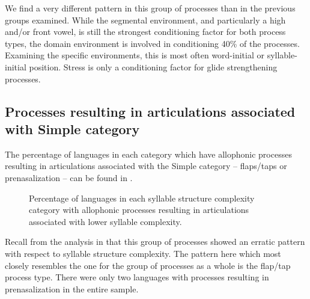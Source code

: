   We find a very different pattern in this group of processes than in the previous groups examined. While the segmental environment, and particularly a high and/or front vowel, is still the strongest conditioning factor for both process types, the domain environment is involved in conditioning 40\% of the processes. Examining the specific environments, this is most often word-initial or syllable-initial position. Stress is only a conditioning factor for glide strengthening processes.

\subsection{Processes resulting in articulations associated with Simple category}\label{sec:7.3.5}

  The percentage of languages in each category which have allophonic processes resulting in articulations associated with the Simple category -- flaps/taps or prenasalization -- can be found in .

\begin{figure}
\caption{\label{fig:7.9}Percentage of languages in each syllable structure complexity category with allophonic processes resulting in articulations associated with lower syllable complexity.}
\end{figure}

  Recall from the analysis in  that this group of processes showed an erratic pattern with respect to syllable structure complexity. The pattern here which most closely resembles the one for the group of processes as a whole is the flap/tap process type. There were only two languages with processes resulting in prenasalization in the entire sample.

